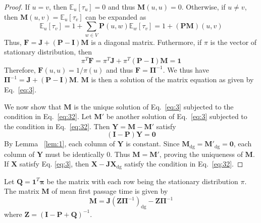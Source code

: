 \begin{proof}
  If $u = v$, then $\mathbb{E}_{u}[\tau_u] = 0$ and thus
  $\mathbf{M}(u,u) = 0$. Otherwise, if $u \not = v$, then
  $\mathbf{M}(u,v) = \mathbb{E}_{u}[\tau_v]$ can be expanded as
  \begin{equation}
    \label{eq:4}
    \mathbb{E}_{u}[\tau_v] = 1 + \sum_{w \in V}{\mathbf{P}(u,w)
      \mathbb{E}_{w}[\tau_v]} = 1 + (\mathbf{PM})(u,v)
  \end{equation}
  Thus, $\mathbf{F} = \mathbf{J} + (\mathbf{P} -
  \mathbf{I})\mathbf{M}$ is a diagonal matrix. Futhermore, if $\pi$ is
  the vector of stationary distribution, then
  \begin{equation}
    \label{eq:26}
    \pi^{T} \mathbf{F} = \pi^{T} \mathbf{J} + \pi^{T} (\mathbf{P} -
    \mathbf{I})\mathbf{M} = \mathbf{1}   
  \end{equation}
  Therefore, $\mathbf{F}(u,u) = 1/\pi(u)$ and thus $\mathbf{F} =
  \bm{\Pi}^{-1}$. We thus have $\bm{\Pi}^{-1} = \mathbf{J} +
  (\mathbf{P} - \mathbf{I})\mathbf{M}$. $\mathbf{M}$ is then a 
  solution of the matrix equation as given by Eq.~\eqref{eq:3}.

  We now show that $\mathbf{M}$ is the unique solution of
  Eq.~\eqref{eq:3} subjected to the condition in
  Eq.~\eqref{eq:32}. Let $\mathbf{M}'$ be another solution of
  Eq.~\eqref{eq:3} subjected to the condition in
  Eq.~\eqref{eq:32}. Then $\mathbf{Y} = \mathbf{M} - \mathbf{M}'$
  satisfy
  \begin{equation}
    \label{eq:19}
    (\mathbf{I} - \mathbf{P})\mathbf{Y} = \mathbf{0}
  \end{equation}
  By Lemma ~\ref{lem:1}, each column of $\mathbf{Y}$ is constant. Since
  $\mathbf{M}_{\mathrm{dg}} = \mathbf{M'}_{\mathrm{dg}} = \mathbf{0}$, each
  column of $\mathbf{Y}$ must be identically $0$. Thus $\mathbf{M} = \mathbf{M'}$,
  proving the uniqueness of $\mathbf{M}$. If $\mathbf{X}$ satisfy
  Eq. \eqref{eq:3}, then $\mathbf{X} - \mathbf{J}\mathbf{X}_{\mathrm{dg}}$
  satisfy the condition in Eq.~\eqref{eq:32}.
\end{proof}
%
\begin{proposition}
  \label{prop:5}
  Let $\mathbf{Q} = \mathbf{1}^{T}\mathbf{\pi}$ be the matrix with each row being
  the stationary distribution $\pi$. The matrix $\mathbf{M}$ of
  mean first passage time is given by
  \begin{equation}
    \label{eq:21}
    \mathbf{M} = \mathbf{J}(\mathbf{Z} \bm{\Pi}^{-1})_{\mathrm{dg}} - \mathbf{Z}
    \bm{\Pi}^{-1}
  \end{equation}
  where $\mathbf{Z} = (\mathbf{I} - \mathbf{P} + \mathbf{Q})^{-1}$. 
\end{proposition}
